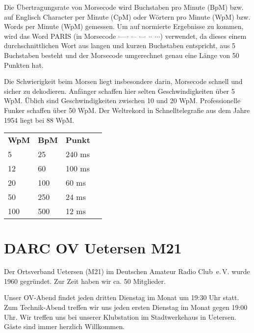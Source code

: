\documentclass{scrartcl}
\newcommand{\dit}{{\LARGE\hskip1pt$\cdot$\hskip1pt}}
\newcommand{\dah}{{\LARGE\hskip1pt--\hskip1pt}}
\begin{document}
    Die Übertragungsrate von Morsecode wird Buchstaben pro Minute (BpM) bzw.
    auf Englisch Character per Minute (CpM) oder
    Wörtern pro Minute (WpM) bzw. Words per Minute (WpM) gemessen.
    Um auf normierte Ergebnisse zu kommen, wird das Word PARIS (in Morsecode
    \mbox{\dit\dah\dah\dit} \mbox{\dit\dah} \mbox{\dit\dah\dit}
    \mbox{\dit\dit} \mbox{\dit\dit\dit})
    verwendet, da dieses einem durchschnittlichen Wort aus langen und kurzen
    Buchstaben entspricht, aus 5 Buchstaben besteht und
    der Morsecode umgerechnet genau eine Länge von 50 Punkten hat.
    
    Die Schwierigkeit beim Morsen liegt insbesondere darin,
    Morsecode schnell und sicher zu dekodieren.
    Anfänger schaffen hier selten Geschwindigkeiten über 5 WpM.
    Üblich sind Geschwindigkeiten zwischen 10 und 20 WpM. Professionelle
    Funker schaffen über 50 WpM. Der Weltrekord in Schnelltelegrafie
    aus dem Jahre 1954 liegt bei 88 WpM.
    
    \begin{tabular}{llll}
      \bfseries WpM & \bfseries BpM & \bfseries Punkt \\
      5 & 25 & 240 ms \\
      12 & 60 & 100 ms \\
      20 & 100 & 60 ms \\
      50 & 250 & 24 ms \\
      100 & 500 & 12 ms
    \end{tabular}
    
    \section{DARC OV Uetersen M21}
    
    Der Ortsverband Uetersen (M21) im Deutschen Amateur Radio Club~e.\,V.
    wurde 1960 gegründet. Zur Zeit haben wir ca. 50 Mitglieder.

    Unser OV-Abend findet jeden dritten Dienstag im Monat um 19:30 Uhr
    statt. Zum Technik-Abend treffen wir uns jeden ersten Dienstag im Monat
    gegen 19:00 Uhr. Wir treffen uns bei unserer Klubstation im Stadtwerkehaus
    in Uetersen. Gäste sind immer herzlich Willkommen.
    
\end{document}
